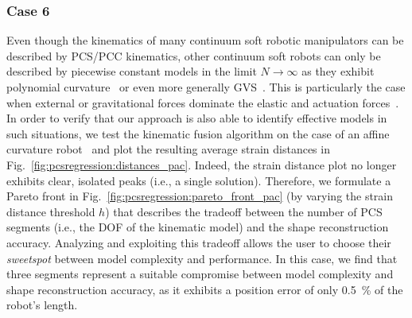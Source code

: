 
\subsubsection{Case 6}
Even though the kinematics of many continuum soft robotic manipulators can be described by \gls{PCS}/\gls{PCC} kinematics, other continuum soft robots can only be described by piecewise constant models in the limit $N \to \infty$ as they exhibit polynomial curvature~\citep{della2019control, stella2022experimental} or even more generally \gls{GVS}~\citep{boyer2020dynamics}.
This is particularly the case when external or gravitational forces dominate the elastic and actuation forces~\citep{della2023model}.
In order to verify that our approach is also able to identify effective models in such situations, we test the kinematic fusion algorithm on the case of an affine curvature robot~\citep{stella2023piecewise} and plot the resulting average strain distances in Fig.~\ref{fig:pcsregression:distances_pac}.
Indeed, the strain distance plot no longer exhibits clear, isolated peaks (i.e., a single solution). Therefore, we formulate a Pareto front in Fig.~\ref{fig:pcsregression:pareto_front_pac} (by varying the strain distance threshold $h$) that describes the tradeoff between the number of \gls{PCS} segments (i.e., the \gls{DOF} of the kinematic model) and the shape reconstruction accuracy. Analyzing and exploiting this tradeoff allows the user to choose their \emph{sweetspot} between model complexity and performance.
In this case, we find that three segments represent a suitable compromise between model complexity and shape reconstruction accuracy, as it exhibits a position error of only \SI{0.5}{\percent} of the robot's length.



